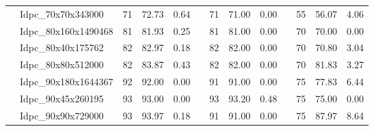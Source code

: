 \begin{table}[htbp]
{\begin{tabular}{clccccccccccc}
			& Idpc\_70x70x343000 & 71  & 72.73  & 0.64 & & 71 & 71.00 & 0.00  & & 55 & \textcolor[rgb]{ 1,  0,  0}{56.07} & 4.06 \\
			& Idpc\_80x160x1490468 & 81  & 81.93 & 0.25 & & 81 & 81.00 & 0.00  & & 70 & \textcolor[rgb]{ 1,  0,  0}{70.00} & 0.00 \\
			& Idpc\_80x40x175762 & 82  & 82.97  & 0.18 & & 82 & 82.00 & 0.00  & & 70 & \textcolor[rgb]{ 1,  0,  0}{70.80} & 3.04 \\
			& Idpc\_80x80x512000 & 82  & 83.87 & 0.43 & & 82 & 82.00 & 0.00  & & 70 & \textcolor[rgb]{ 1,  0,  0}{81.83} & 3.27 \\
			& Idpc\_90x180x1644367 & 92 & 92.00 & 0.00 & & 91 & 91.00 & 0.00  & & 75 & \textcolor[rgb]{ 1,  0,  0}{77.83} & 6.44 \\
			& Idpc\_90x45x260195 & 93 & 93.00 & 0.00 & & 93 & 93.20 & 0.48  & & 75 & \textcolor[rgb]{ 1,  0,  0}{75.00} & 0.00 \\
			& Idpc\_90x90x729000 & 93 & 93.97 & 0.18 & & 91 & 91.00 & 0.00 & & 75 & \textcolor[rgb]{ 1,  0,  0}{87.97} & 8.64 \\
			\bottomrule
		\end{tabular}%
	}
	\label{tab:type_2}%
\end{table}